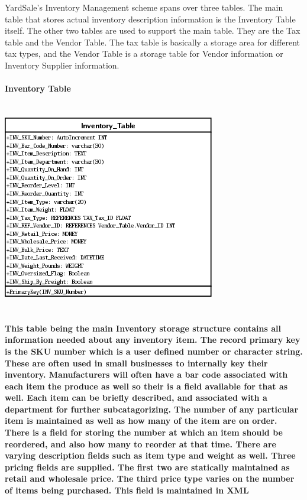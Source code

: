 \documentclass{report}
\begin{document}
	YardSale's Inventory Management scheme spans over three tables. The main table that
	stores actual inventory description information is the Inventory Table itself. The
	other two tables are used to support the main table. They are the Tax table and the
	Vendor Table. The tax table is basically a storage area for different tax types, and
	the Vendor Table is a storage table for Vendor information or Inventory Supplier
	information.\\
	\\
	\bf{Inventory Table}\\
	\\
	\\
	\includegraphics{Tables/InventoryTable.png}\\
	\\
	\\
	This table being the main Inventory storage structure contains all information needed
	about any inventory item. The record primary key is the SKU number which is a user
	defined number or character string. These are often used in small businesses to
	internally key their inventory. Manufacturers will often have a bar code associated
	with each item the produce as well so their is a field available for that as well.
	Each item can be briefly described, and associated with a department for further
	subcatagorizing. The number of any particular item is maintained as well as how many
	of the item are on order. There is a field for storing the number at which an item should
	be reordered, and also how many to reorder at that time. There are varying description
	fields such as item type and weight as well. Three pricing fields are supplied. The
	first two are statically maintained as retail and wholesale price. The third price
	type varies on the number of items being purchased. This field is maintained in XML
\end{document}

